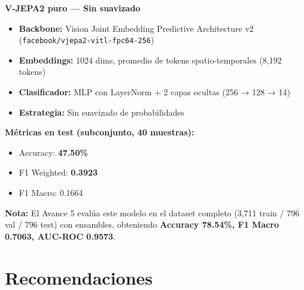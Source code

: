 \documentclass[11pt,letterpaper]{article}
\begin{document}
\begin{tcolorbox}[colback=yellow!10, colframe=vjepaBlue, title=\textbf{Modelo Seleccionado para Avance 5}]
\textbf{V-JEPA2 puro — Sin suavizado}

\begin{itemize}[leftmargin=1.5em, noitemsep]
  \item \textbf{Backbone:} Vision Joint Embedding Predictive Architecture v2 (\texttt{facebook/vjepa2-vitl-fpc64-256})
  \item \textbf{Embeddings:} 1024 dims, promedio de tokens spatio-temporales (8,192 tokens)
  \item \textbf{Clasificador:} MLP con LayerNorm + 2 capas ocultas (256 → 128 → 14)
  \item \textbf{Estrategia:} Sin suavizado de probabilidades
\end{itemize}

\vspace{0.5em}
\textbf{Métricas en test (subconjunto, 40 muestras):}
\begin{itemize}[leftmargin=1.5em, noitemsep]
  \item Accuracy: \textbf{47.50\%}
  \item F1 Weighted: \textbf{0.3923}
  \item F1 Macro: 0.1664
\end{itemize}

\vspace{0.5em}
\textbf{Nota:} El Avance 5 evalúa este modelo en el dataset completo (3,711 train / 796 val / 796 test) con ensambles, obteniendo \textbf{Accuracy 78.54\%, F1 Macro 0.7063, AUC-ROC 0.9573}.
\end{tcolorbox}

\section{Recomendaciones}
\end{document}
